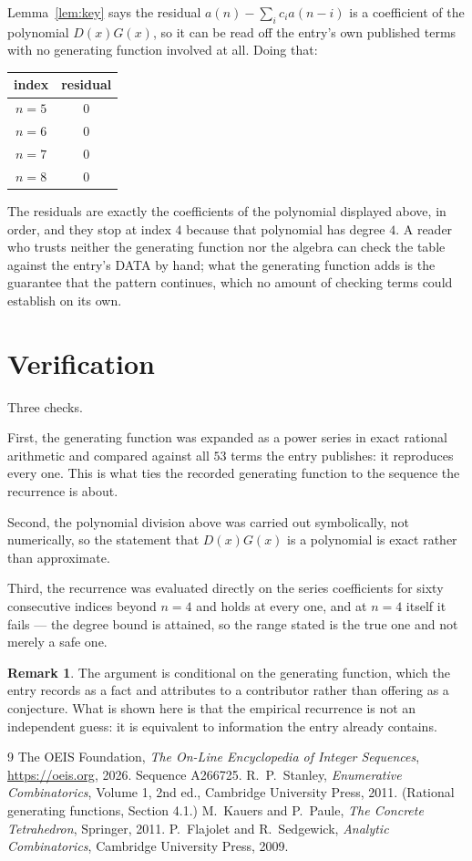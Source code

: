 \documentclass[11pt,a4paper]{article}
\theoremstyle{plain}
\theoremstyle{definition}
\newtheorem{remark}[theorem]{Remark}
\begin{document}
Lemma~\ref{lem:key} says the residual $a(n)-\sum_ic_ia(n-i)$ is a coefficient of the
polynomial $D(x)G(x)$, so it can be read off the entry's own published terms with no
generating function involved at all. Doing that:
\begin{center}
\begin{tabular}{cc}
index & residual \\ \hline
$n=5$ & $0$ \\
$n=6$ & $0$ \\
$n=7$ & $0$ \\
$n=8$ & $0$
\end{tabular}
\end{center}
The residuals are exactly the coefficients of the polynomial displayed above, in order, and
they stop at index $4$ because that polynomial has degree $4$. A reader who trusts
neither the generating function nor the algebra can check the table against the entry's DATA
by hand; what the generating function adds is the guarantee that the pattern continues, which
no amount of checking terms could establish on its own.

\section{Verification}

Three checks.

First, the generating function was expanded as a power series in exact rational arithmetic and
compared against all $53$ terms the entry publishes: it reproduces every one. This is
what ties the recorded generating function to the sequence the recurrence is about.

Second, the polynomial division above was carried out symbolically, not numerically, so the
statement that $D(x)G(x)$ is a polynomial is exact rather than approximate.

Third, the recurrence was evaluated directly on the series coefficients for sixty consecutive
indices beyond $n=4$ and holds at every one, and at $n=4$ itself it fails --- the
degree bound is attained, so the range stated is the true one and not merely a safe one.

\begin{remark}
The argument is conditional on the generating function, which the entry records as a fact and
attributes to a contributor rather than offering as a conjecture. What is shown here is that
the empirical recurrence is not an independent guess: it is equivalent to information the
entry already contains.
\end{remark}

\begin{thebibliography}{9}
 The OEIS Foundation, \emph{The On-Line Encyclopedia of Integer
Sequences}, \url{https://oeis.org}, 2026. Sequence A266725.
 R.~P.~Stanley, \emph{Enumerative Combinatorics}, Volume 1, 2nd ed.,
Cambridge University Press, 2011. (Rational generating functions, Section 4.1.)
 M.~Kauers and P.~Paule, \emph{The Concrete Tetrahedron}, Springer, 2011.
 P.~Flajolet and R.~Sedgewick, \emph{Analytic Combinatorics}, Cambridge
University Press, 2009.
\end{thebibliography}
\end{document}

